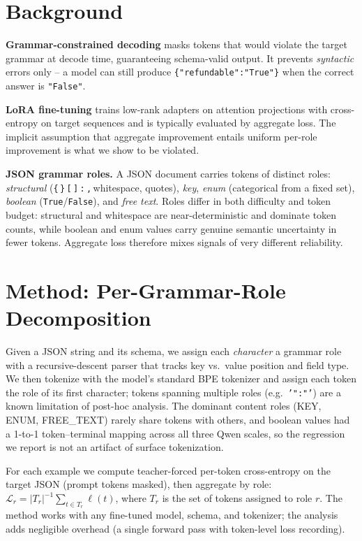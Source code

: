 \documentclass{article}
\begin{document}
\section{Background}

\textbf{Grammar-constrained decoding} \cite{guidance2024,willard2023outlines,zheng2024sglang,xgrammar2024} masks tokens that would violate the target grammar at decode time, guaranteeing schema-valid output. It prevents \emph{syntactic} errors only -- a model can still produce \texttt{\{"refundable":"True"\}} when the correct answer is \texttt{"False"}.

\textbf{LoRA fine-tuning} \cite{hu2021lora} trains low-rank adapters on attention projections with cross-entropy on target sequences and is typically evaluated by aggregate loss. The implicit assumption that aggregate improvement entails uniform per-role improvement is what we show to be violated.

\textbf{JSON grammar roles.} A JSON document carries tokens of distinct roles: \emph{structural} (\texttt{\{}\,\texttt{\}}\,\texttt{[}\,\texttt{]}\,\texttt{:}\,\texttt{,}\,whitespace, quotes), \emph{key}, \emph{enum} (categorical from a fixed set), \emph{boolean} (\texttt{True}/\texttt{False}), and \emph{free text}. Roles differ in both difficulty and token budget: structural and whitespace are near-deterministic and dominate token counts, while boolean and enum values carry genuine semantic uncertainty in fewer tokens. Aggregate loss therefore mixes signals of very different reliability.

\section{Method: Per-Grammar-Role Decomposition}\label{sec:method-decomposition}

Given a JSON string and its schema, we assign each \emph{character} a grammar role with a recursive-descent parser that tracks key vs.\ value position and field type. We then tokenize with the model's standard BPE tokenizer and assign each token the role of its first character; tokens spanning multiple roles (e.g.\ \texttt{'":"'}) are a known limitation of post-hoc analysis. The dominant content roles (KEY, ENUM, FREE\_TEXT) rarely share tokens with others, and boolean values had a 1-to-1 token--terminal mapping across all three Qwen scales, so the regression we report is not an artifact of surface tokenization.

For each example we compute teacher-forced per-token cross-entropy on the target JSON (prompt tokens masked), then aggregate by role: $\mathcal{L}_r = |T_r|^{-1} \sum_{t \in T_r} \ell(t)$, where $T_r$ is the set of tokens assigned to role $r$. The method works with any fine-tuned model, schema, and tokenizer; the analysis adds negligible overhead (a single forward pass with token-level loss recording).
\end{document}
